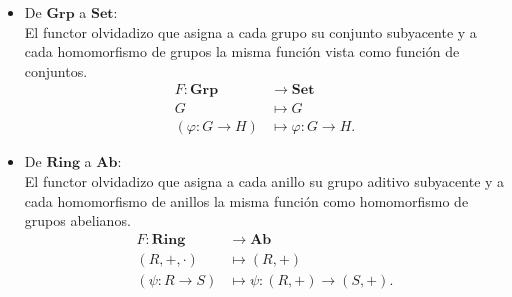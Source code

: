 \begin{ejemplo}
{\begin{itemize}
			\item De $\mathbf{Grp}$ a $\mathbf{Set}$: \\
			El functor olvidadizo que asigna a cada grupo su conjunto subyacente y a cada homomorfismo de grupos la misma función vista como función de conjuntos.
			\begin{align*}
				F : \mathbf{Grp} &\longrightarrow \mathbf{Set}\\[5pt]
				G &\longmapsto G\\
				(\varphi: G \to H) &\longmapsto \varphi: G \to H.
			\end{align*}
			
			\item De $\mathbf{Ring}$ a $\mathbf{Ab}$: \\
			El functor olvidadizo que asigna a cada anillo su grupo aditivo subyacente y a cada homomorfismo de anillos la misma función como homomorfismo de grupos abelianos.
			\begin{align*}
				F : \mathbf{Ring} &\longrightarrow \mathbf{Ab}\\[5pt]
				(R, +, \cdot) &\longmapsto (R, +)\\
				(\psi: R \to S) &\longmapsto \psi: (R, +) \to (S, +).
			\end{align*}
		\end{itemize}
	}
\end{ejemplo}



